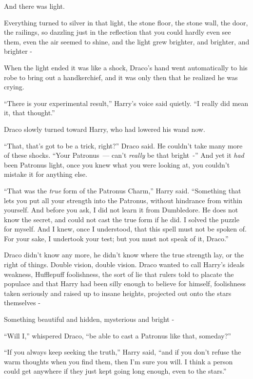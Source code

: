 And there was light.

Everything turned to silver in that light, the stone floor, the stone wall, the door, the railings, so dazzling just in the reflection that you could hardly even see them, even the air seemed to shine, and the light grew brighter, and brighter, and brighter -

When the light ended it was like a shock, Draco's hand went automatically to his robe to bring out a handkerchief, and it was only then that he realized he was crying.

``There is your experimental result,'' Harry's voice said quietly. ``I really did mean it, that thought.''

Draco slowly turned toward Harry, who had lowered his wand now.

``That, that's got to be a trick, right?'' Draco said. He couldn't take many more of these shocks. ``Your Patronus~--- can't \emph{really} be that bright~-'' And yet it \emph{had} been Patronus light, once you knew what you were looking at, you couldn't mistake it for anything else.

``That was the \emph{true} form of the Patronus Charm,'' Harry said. ``Something that lets you put all your strength into the Patronus, without hindrance from within yourself. And before you ask, I did not learn it from Dumbledore. He does not know the secret, and could not cast the true form if he did. I solved the puzzle for myself. And I knew, once I understood, that this spell must not be spoken of. For your sake, I undertook your test; but you must not speak of it, Draco.''

Draco didn't know any more, he didn't know where the true strength lay, or the right of things. Double vision, double vision. Draco wanted to call Harry's ideals weakness, Hufflepuff foolishness, the sort of lie that rulers told to placate the populace and that Harry had been silly enough to believe for himself, foolishness taken seriously and raised up to insane heights, projected out onto the stars themselves -

Something beautiful and hidden, mysterious and bright -

``Will I,'' whispered Draco, ``be able to cast a Patronus like that, someday?''

``If you always keep seeking the truth,'' Harry said, ``and if you don't refuse the warm thoughts when you find them, then I'm sure you will. I think a person could get anywhere if they just kept going long enough, even to the stars.''

